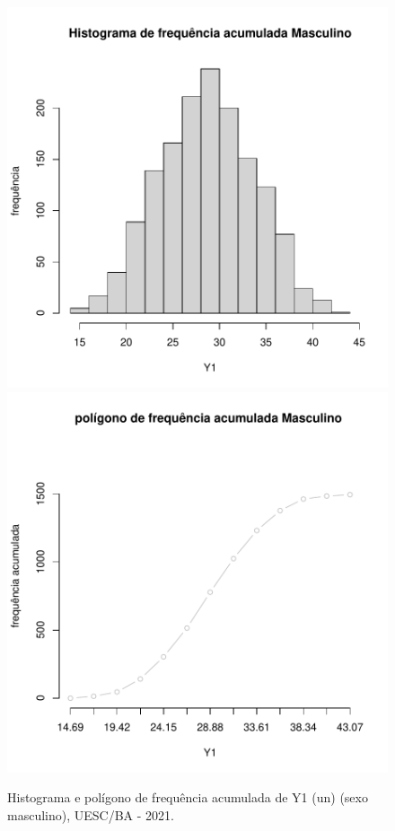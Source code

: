 \documentclass[12pt]{article}\usepackage[]{graphicx}\usepackage[]{color}
\newenvironment{knitrout}{}{} %
\begin{document}
\begin{figure}[!h]
\label{figura:Histograma-Poligono-M}
\begin{knitrout}
\color{fgcolor}

{\centering \includegraphics[width=.4\linewidth]{figure/minimal-Histograma-Poligono-Masc-1} 
\includegraphics[width=.4\linewidth]{figure/minimal-Histograma-Poligono-Masc-2}
\caption{Histograma e polígono de frequência acumulada de Y1 (un) (sexo masculino), UESC/BA - 2021.}
}


\end{knitrout}
\end{figure}
\end{document}
